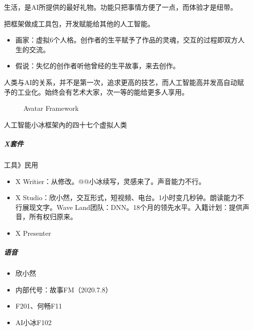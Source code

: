 \documentclass[letterpaper,10pt,english]{sphinxmanual}
\begin{document}
生活，是AI所提供的最好礼物。功能只把事情方便了一点，而体验才是纽带。

把框架做成工具包，开发赋能给其他的人工智能。
\begin{itemize}
\item {} 
画家：虚拟6个人格。创作者的生平赋予了作品的灵魂，交互的过程即双方人生的交流。

\item {} 
假说：失忆的创作者听他曾经的生平故事，来去创作。

\end{itemize}

人类与AI的关系，并不是第一次，追求更高的技艺，而人工智能高并发高自动赋予的工业化。始终会有艺术大家，次一等的能给更多人享用。%
\begin{footnote}[1064]\sphinxAtStartFootnote
{}
%
\end{footnote}

\begin{figure}[H]
\centering
\capstart

\noindent{}
\caption{Avatar Framework}\label{\detokenize{chapter_AI_company/xiaoice:id27}}\end{figure}

人工智能小冰框架內的四十七个虚拟人类%
\begin{footnote}[1065]\sphinxAtStartFootnote
{}
%
\end{footnote}


\subparagraph{X套件}
\label{\detokenize{chapter_AI_company/xiaoice:x}}
工具\sphinxhyphen{}》民用
\begin{itemize}
\item {} 
X Writier：从修改。@@小冰续写，灵感来了。声音能力不行。

\item {} 
X
Studio：欣小然，交互形式，短视频、电台。1小时变几秒钟。朗读能力不行展现文字。Wave
Land团队：DNN。18个月的领先水平。入籍计划：提供声音，所有权归原来。

\item {} 
X Presenter

\end{itemize}


\subparagraph{语音}
\label{\detokenize{chapter_AI_company/xiaoice:id14}}\begin{itemize}
\item {} 
欣小然

\item {} 
内部代号：故事FM（2020.7.8）

\item {} 
F201、何畅F11

\item {} 
AI小冰F102

\end{itemize}
\end{document}
